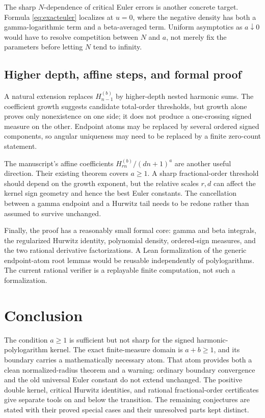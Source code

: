 \documentclass[11pt]{article}
\numberwithin{equation}{section}
\theoremstyle{definition}\newtheorem{definition}[theorem]{Definition}
\theoremstyle{remark}\newtheorem{remark}[theorem]{Remark}
\begin{document}
The sharp $N$-dependence of critical Euler errors is another concrete
target. Formula \eqref{eq:exacteuler} localizes at $u=0$, where the
negative density has both a gamma-logarithmic term and a beta-averaged
term. Uniform asymptotics as $a\downarrow0$ would have to resolve
competition between $N$ and $a$, not merely fix the parameters before
letting $N$ tend to infinity.

\subsection{Higher depth, affine steps, and formal proof}
A natural extension replaces $H_{n-1}^{(b)}$ by higher-depth nested
harmonic sums. The coefficient growth suggests candidate total-order
thresholds, but growth alone proves only nonexistence on one side;
it does not produce a one-crossing signed measure on the other.
Endpoint atoms may be replaced by several ordered signed components,
so angular uniqueness may need to be replaced by a finite zero-count
statement.

The manuscript's affine coefficients $H_{rn}^{(b)}/(dn+1)^a$ are
another useful direction. Their existing theorem covers $a\ge1$.
A sharp fractional-order threshold should depend on the growth
exponent, but the relative scales $r,d$ can affect the kernel sign
geometry and hence the best Euler constants. The cancellation between
a gamma endpoint and a Hurwitz tail needs to be redone rather than
assumed to survive unchanged.

Finally, the proof has a reasonably small formal core: gamma and beta
integrals, the regularized Hurwitz identity, polynomial density,
ordered-sign measures, and the two rational derivative factorizations.
A Lean formalization of the generic endpoint-atom root lemmas would
be reusable independently of polylogarithms. The current rational
verifier is a replayable finite computation, not such a formalization.

\section*{Conclusion}
The condition $a\ge1$ is sufficient but not sharp for the signed
harmonic-polylogarithm kernel. The exact finite-measure domain is
$a+b\ge1$, and its boundary carries a mathematically necessary atom.
That atom provides both a clean normalized-radius theorem and a warning:
ordinary boundary convergence and the old universal Euler constant
do not extend unchanged. The positive double kernel, critical
Hurwitz identities, and rational fractional-order certificates give
separate tools on and below the transition. The remaining conjectures
are stated with their proved special cases and their unresolved parts
kept distinct.
\end{document}
